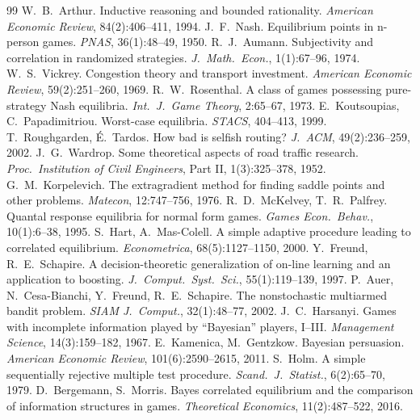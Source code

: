 \documentclass{article}
\begin{document}
\begin{thebibliography}{99}\footnotesize\setlength{\itemsep}{0pt}
 W.~B.~Arthur. Inductive reasoning and bounded rationality. \emph{American Economic Review}, 84(2):406--411, 1994.
 J.~F.~Nash. Equilibrium points in n-person games. \emph{PNAS}, 36(1):48--49, 1950.
 R.~J.~Aumann. Subjectivity and correlation in randomized strategies. \emph{J.\ Math.\ Econ.}, 1(1):67--96, 1974.
 W.~S.~Vickrey. Congestion theory and transport investment. \emph{American Economic Review}, 59(2):251--260, 1969.
 R.~W.~Rosenthal. A class of games possessing pure-strategy Nash equilibria. \emph{Int.\ J.\ Game Theory}, 2:65--67, 1973.
 E.~Koutsoupias, C.~Papadimitriou. Worst-case equilibria. \emph{STACS}, 404--413, 1999.
 T.~Roughgarden, \'E.~Tardos. How bad is selfish routing? \emph{J.\ ACM}, 49(2):236--259, 2002.
 J.~G.~Wardrop. Some theoretical aspects of road traffic research. \emph{Proc.\ Institution of Civil Engineers}, Part II, 1(3):325--378, 1952.
 G.~M.~Korpelevich. The extragradient method for finding saddle points and other problems. \emph{Matecon}, 12:747--756, 1976.
 R.~D.~McKelvey, T.~R.~Palfrey. Quantal response equilibria for normal form games. \emph{Games Econ.\ Behav.}, 10(1):6--38, 1995.
 S.~Hart, A.~Mas-Colell. A simple adaptive procedure leading to correlated equilibrium. \emph{Econometrica}, 68(5):1127--1150, 2000.
 Y.~Freund, R.~E.~Schapire. A decision-theoretic generalization of on-line learning and an application to boosting. \emph{J.\ Comput.\ Syst.\ Sci.}, 55(1):119--139, 1997.
 P.~Auer, N.~Cesa-Bianchi, Y.~Freund, R.~E.~Schapire. The nonstochastic multiarmed bandit problem. \emph{SIAM J.\ Comput.}, 32(1):48--77, 2002.
 J.~C.~Harsanyi. Games with incomplete information played by ``Bayesian'' players, I--III. \emph{Management Science}, 14(3):159--182, 1967.
 E.~Kamenica, M.~Gentzkow. Bayesian persuasion. \emph{American Economic Review}, 101(6):2590--2615, 2011.
 S.~Holm. A simple sequentially rejective multiple test procedure. \emph{Scand.\ J.\ Statist.}, 6(2):65--70, 1979.
 D.~Bergemann, S.~Morris. Bayes correlated equilibrium and the comparison of information structures in games. \emph{Theoretical Economics}, 11(2):487--522, 2016.
\end{thebibliography}
\end{document}
